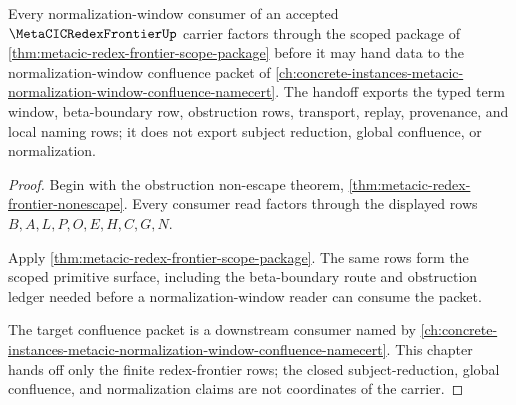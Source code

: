 \begin{theorem}
\label{thm:metacic-redex-frontier-normalization-window-handoff}
Every normalization-window consumer of an accepted $\MetaCICRedexFrontierUp$ carrier factors through the scoped package of \autoref{thm:metacic-redex-frontier-scope-package} before it may hand data to the normalization-window confluence packet of \autoref{ch:concrete-instances-metacic-normalization-window-confluence-namecert}. The handoff exports the typed term window, beta-boundary row, obstruction rows, transport, replay, provenance, and local naming rows; it does not export subject reduction, global confluence, or normalization.
\end{theorem}
\begin{proof}
Begin with the obstruction non-escape theorem, \autoref{thm:metacic-redex-frontier-nonescape}. Every consumer read factors through the displayed rows $B,A,L,P,O,E,H,C,G,N$.

Apply \autoref{thm:metacic-redex-frontier-scope-package}. The same rows form the scoped primitive surface, including the beta-boundary route and obstruction ledger needed before a normalization-window reader can consume the packet.

The target confluence packet is a downstream consumer named by \autoref{ch:concrete-instances-metacic-normalization-window-confluence-namecert}. This chapter hands off only the finite redex-frontier rows; the closed subject-reduction, global confluence, and normalization claims are not coordinates of the carrier.
\end{proof}

